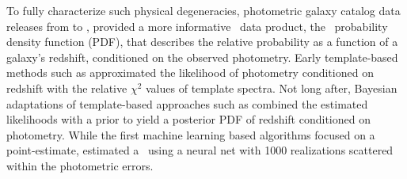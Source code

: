 To fully characterize such physical degeneracies, photometric galaxy catalog data releases from \citep{Mandelbaum:2008} to \citep{de_Jong:17}, provided a more informative \pz\ data product, the \pz\ probability density function (PDF), that describes the relative probability as a function of a galaxy's redshift, conditioned on the observed photometry.
Early template-based methods such as \citet{Fernandezsoto:99} approximated the likelihood of photometry conditioned on redshift with the relative $\chi^{2}$ values of template spectra.
Not long after, Bayesian adaptations of template-based approaches such as \citet{Benitez:00} combined the estimated likelihoods with a prior to yield a posterior PDF of redshift conditioned on photometry.
While the first machine learning based algorithms focused on a point-estimate, \citet{Firth:03} estimated a \pzpdf\ using a neural net with 1000 realizations scattered within the photometric errors.


